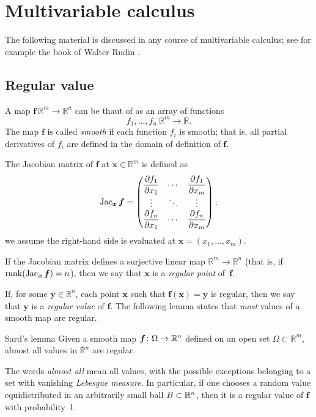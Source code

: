 \section{Multivariable calculus}

The following material is discussed in any course of multivariable calculus;
see for example the book of Walter Rudin \cite{rudin}.

\subsection*{Regular value}

A map $\bm{f}\:\mathbb{R}^m\to\mathbb{R}^n$ can be thaut of as an array of functions 
\[f_1,\dots,f_n\:\mathbb{R}^m\to \mathbb{R}.\]
The map $\bm{f}$ is called \emph{smooth} if each function $f_i$ is smooth;
that is, all partial derivatives of $f_i$ are defined in the domain of definition of $\bm{f}$.

The Jacobian matrix of $\bm{f}$ at $\bm{x}\in\mathbb{R}^m$ is defined as 
\[\mathop{\rm Jac}\nolimits_{\bm{x}}\bm{f}=
\begin{pmatrix}
\dfrac{\partial f_1}{\partial x_1} & \cdots & \dfrac{\partial f_1}{\partial x_m}\\
\vdots & \ddots & \vdots\\
\dfrac{\partial f_n}{\partial x_1} & \cdots & \dfrac{\partial f_n}{\partial x_m} \end{pmatrix};\]
we assume the right-hand side is evaluated at $\bm{x}=(x_1,\dots,x_m)$.

If the Jacobian matrix defines a surjective linear map $\mathbb{R}^m\to\mathbb{R}^n$ (that is, if $\mathop{\rm rank}\nolimits(\mathop{\rm Jac}\nolimits_{\bm{x}}\bm{f})=n$), then we say that 
$\bm{x}$ is a \emph{regular point} of~$\bm{f}$.

If, for some $\bm{y}\in \mathbb{R}^n$, each point $\bm{x}$ such that $\bm{f}(\bm{x})=\bm{y}$ is regular,
then we say that $\bm{y}$ is a \emph{regular value} of $\bm{f}$.
The following lemma states that {}\emph{most} values of a smooth map are regular.

\begin{thm}{Sard's lemma}\label{lem:sard}
Given a smooth map $\bm{f}\colon \Omega \z\to \mathbb{R}^n$ defined on an open set $\Omega\subset \mathbb{R}^m$, almost all values in $\mathbb{R}^n$ are regular.
\end{thm}

The words \emph{almost all} mean all values, with the possible exceptions belonging to a set with vanishing {}\emph{Lebesgue measure}.
In particular, if one chooses a random value equidistributed in an arbitrarily small ball $B\z\subset \mathbb{R}^n$, then it is a regular value of $\bm{f}$ with probability~1.

